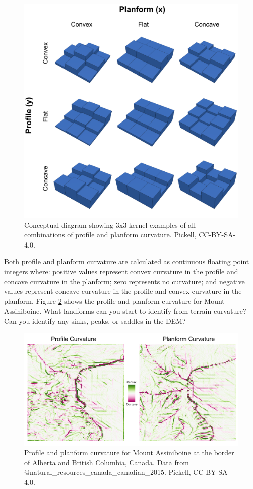 \documentclass[
]{book}
\begin{document}
\begin{figure}
\includegraphics[width=0.75\linewidth]{images/09-stacked-profile-planform-kernel} \caption{Conceptual diagram showing 3x3 kernel examples of all combinations of profile and planform curvature. Pickell, CC-BY-SA-4.0.}\label{fig:9-stacked-profile-planform-kernel}
\end{figure}

Both profile and planform curvature are calculated as continuous floating point integers where: positive values represent convex curvature in the profile and concave curvature in the planform; zero represents no curvature; and negative values represent concave curvature in the profile and convex curvature in the planform. Figure \ref{fig:9-mount-assiniboine-profile-planform-curvature} shows the profile and planform curvature for Mount Assiniboine. What landforms can you start to identify from terrain curvature? Can you identify any sinks, peaks, or saddles in the DEM?

\begin{figure}
\includegraphics[width=0.75\linewidth]{images/09-mount-assiniboine-profile-planform-curvature} \caption{Profile and planform curvature for Mount Assiniboine at the border of Alberta and British Columbia, Canada. Data from @natural_resources_canada_canadian_2015. Pickell, CC-BY-SA-4.0.}\label{fig:9-mount-assiniboine-profile-planform-curvature}
\end{figure}
\end{document}
